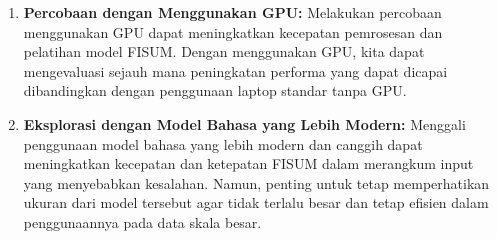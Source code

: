 \begin{enumerate}[nolistsep]

    \item \textbf{Percobaan dengan Menggunakan GPU:}
    Melakukan percobaan menggunakan GPU dapat meningkatkan
    kecepatan pemrosesan dan pelatihan model FISUM. Dengan
    menggunakan GPU, kita dapat mengevaluasi sejauh mana
    peningkatan performa yang dapat dicapai dibandingkan
    dengan penggunaan laptop standar tanpa GPU.
    \item \textbf{Eksplorasi dengan Model Bahasa yang Lebih Modern:}
    Menggali penggunaan model bahasa yang lebih modern dan
    canggih dapat meningkatkan kecepatan dan ketepatan FISUM
    dalam merangkum input yang menyebabkan kesalahan. Namun,
    penting untuk tetap memperhatikan ukuran dari model
    tersebut agar tidak terlalu besar dan tetap efisien dalam
    penggunaannya pada data skala besar.

\end{enumerate}
